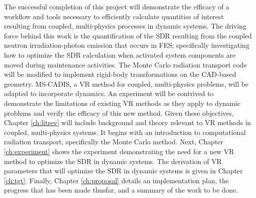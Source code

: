 The successful completion of this project will demonstrate the efficacy of a workflow and tools
necessary to efficiently calculate quantities of interest resulting from
coupled, multi-physics processes in dynamic systems.  
The driving force behind this work is the quantification of the
SDR resulting from the coupled neutron
irradiation-photon emission that occurs in FES;
specifically investigating how to optimize the SDR calculation when %
activated system components are moved during maintenance activities.
The Monte Carlo radiation transport code will
be modified to implement rigid-body transformations on the CAD-based geometry.
MS-CADIS, a VR method for coupled, multi-physics problems, will be adapted to
incorporate dynamics.  An experiment will be contrived to demonstrate the
limitations of existing VR methods as they apply to dynamic problems and verify
the efficacy of this new method.  Given these objectives, Chapter \ref{ch:litrev}
will include background and theory relevant to VR methods in coupled,
multi-physics systems.  
It begins with an introduction to computational
radiation transport, specifically the Monte Carlo method.
Next, Chapter \ref{ch:experiment} shows the experiment demonstrating the need
for a new VR method to optimize the SDR in dynamic systems.  The derivation of
VR parameters that will optimize the SDR in dynamic systems is given in
Chapter \ref{ch:tgt}. Finally, Chapter \ref{ch:proposal} details an implementation plan, 
the progress that has been made thusfar, and a summary of the
work to be done.
